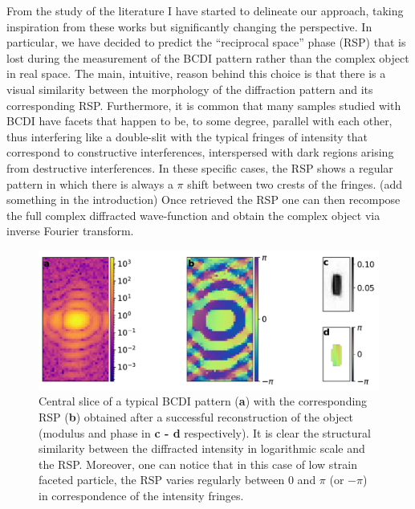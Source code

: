 From the study of the literature I have started to delineate our approach, taking inspiration from these works but 
significantly changing the perspective. In particular, we have decided to predict the ``reciprocal space'' phase (RSP) that is 
lost during the measurement of the BCDI pattern rather than the complex object in real space.
The main, intuitive, reason behind this choice is that there is a visual 
similarity between the morphology of the diffraction pattern and its corresponding RSP. 
Furthermore, it is common that many samples studied with BCDI have facets that happen to be, to some degree, parallel with each other, 
thus interfering like a double-slit with the typical fringes of intensity that correspond to constructive interferences, 
interspersed with dark regions arising from destructive interferences. In these specific cases, the RSP shows a regular 
pattern in which there is always a $\pi$ shift between two crests of the fringes. (add something in the introduction)
Once retrieved the RSP one can then recompose the full complex diffracted wave-function and obtain the complex object via 
inverse Fourier transform.\\

\begin{figure}[H]
    \centering
    \includegraphics[width=.8\textwidth]{figures/Phasing/rec_space_phase.pdf}
    \caption{Central slice of a typical BCDI pattern (\textbf{a}) with the corresponding RSP (\textbf{b}) obtained after a 
    successful reconstruction of the object (modulus and phase in \textbf{c - d} respectively). It is clear the structural similarity between the diffracted intensity 
    in logarithmic scale and the RSP. Moreover, one can notice that in this case of low strain faceted particle, 
     the RSP varies regularly between 0 and $\pi$ (or $-\pi$) in correspondence of the intensity fringes. }
    \label{fig:rec_space_phase}
\end{figure}

